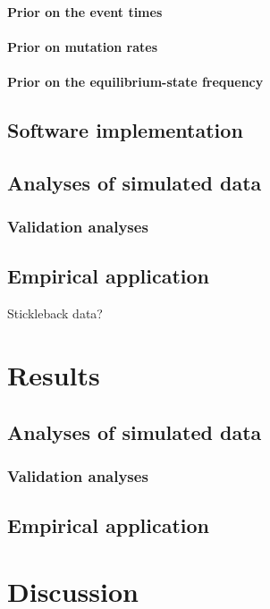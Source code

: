 \paragraph{Prior on the event times}

\paragraph{Prior on mutation rates}

\paragraph{Prior on the equilibrium-state frequency}

\subsection{Software implementation}

\subsection{Analyses of simulated data}

\subsubsection{Validation analyses}

\subsection{Empirical application}
Stickleback data?


\section{Results}

\subsection{Analyses of simulated data}

\subsubsection{Validation analyses}

\subsection{Empirical application}


\section{Discussion}
